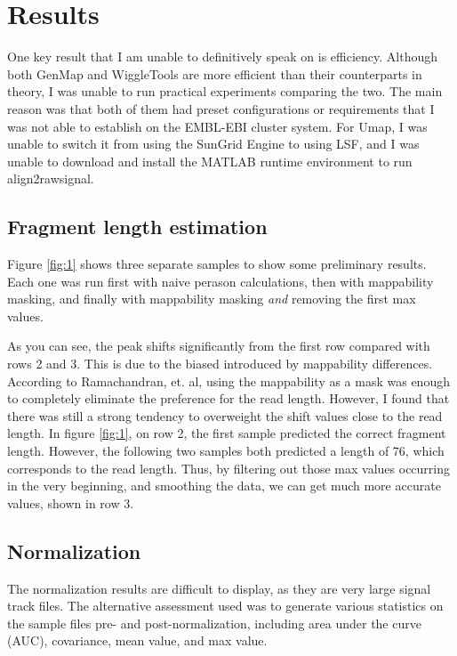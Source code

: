 \documentclass[a4paper]{article}
\begin{document}
  \section{Results}
  One key result that I am unable to definitively speak on is efficiency. Although both GenMap and WiggleTools are more
  efficient than their counterparts in theory, I was unable to run practical experiments comparing the two. The main
  reason was that both of them had preset configurations or requirements that I was not able to establish on the
  EMBL-EBI cluster system. For Umap, I was unable to switch it from using the SunGrid Engine to using LSF, and I
  was unable to download and install the MATLAB runtime environment to run align2rawsignal.

    \subsection{Fragment length estimation}
    Figure \ref{fig:1} shows three separate samples to show some preliminary results. Each one was run first with naive perason calculations,
    then with mappability masking, and finally with mappability masking \textit{and} removing the first max values.

    As you can see, the peak shifts significantly from the first row compared with rows 2 and 3. This is due to the
    biased introduced by mappability differences.
    According to Ramachandran, et. al, using the mappability as a mask was enough to completely eliminate the preference
    for the read length. However, I found that there was still a strong tendency to overweight the shift values close to
    the read length. In figure \ref{fig:1}, on row 2, the first sample predicted the correct fragment length. However,
    the following two samples both predicted a length of 76, which corresponds to the read length. Thus, by filtering out
    those max values occurring in the very beginning, and smoothing the data, we can get much more accurate values,
    shown in row 3.

    \subsection{Normalization}

    The normalization results are difficult to display, as they are very large signal track files. The alternative
    assessment used was to generate various statistics on the sample files pre- and post-normalization, including
    area under the curve (AUC), covariance, mean value, and max value.
\end{document}

